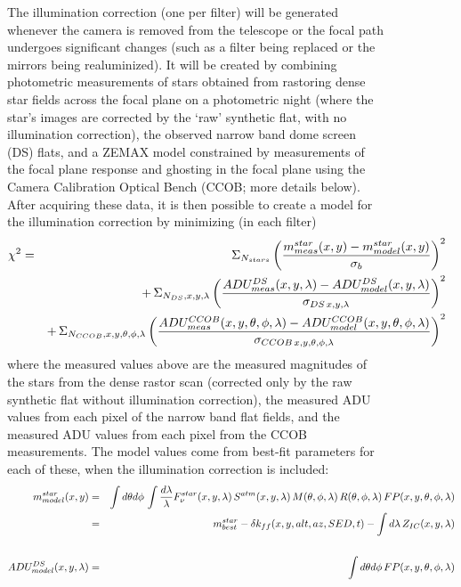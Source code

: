 \documentclass[12pt,preprint]{aastex}
\begin{document}
\begin{figure}[htbp]
{The illumination correction (one per filter) will be generated
whenever the camera is removed from the telescope or the focal path
undergoes significant changes (such as a filter being replaced or the
mirrors being realuminized). It will be created by combining
photometric measurements of stars obtained from rastoring dense star
fields across the focal plane on a photometric night (where the star's
images are corrected by the `raw' synthetic flat, with no illumination
correction), the observed narrow band dome screen (DS) flats, and a
ZEMAX model constrained by measurements of the focal plane response
and ghosting in the focal plane using the Camera Calibration Optical
Bench (CCOB; more details below). After acquiring these data, it is then possible to
create a model for the illumination correction by minimizing (in each
filter)
\begin{eqnarray}
 \chi^2 & = & \Sigma_{N_{stars}} \left( { m^{star}_{meas}(x,y) - m^{star}_{model}(x,y)
\over \sigma_b} \right)^2  \\
  & & +\, \Sigma_{N_{DS}, x,y,\lambda} \left( {
    ADU^{DS}_{meas}(x,y,\lambda) - ADU^{DS}_{ model}(x,y,\lambda) \over
    \sigma_{DS \, x,y,\lambda } } \right)^2  \nonumber  \\
 & & +\,  \Sigma_{N_{CCOB},x,y,\theta,\phi,\lambda} \left( { 
   ADU^{CCOB}_{meas}(x,y,\theta,\phi,\lambda) - ADU^{CCOB}_{model}(x,y,\theta,\phi,\lambda) \over
   \sigma_{CCOB \,x,y,\theta,\phi,\lambda}}  \right)^2   \nonumber
\end{eqnarray}
where the measured values above are the measured magnitudes of the stars
from the dense rastor scan (corrected only by the raw synthetic flat
without illumination correction), the measured ADU values from each pixel of the narrow band
flat fields, and the measured ADU values from each pixel from the CCOB
measurements. The model values come from best-fit parameters for each
of these, when the illumination correction is included: 
\begin{eqnarray}
m^{star}_{model}(x,y) & = &  \int d\theta d\phi \, \int {d\lambda \over \lambda}
F_\nu^{star}(x,y,\lambda)\,S^{atm}(x,y,\lambda)\,M(\theta,\phi,\lambda)\,R(\theta,\phi,\lambda)\,FP(x,y,\theta,\phi,\lambda)
\nonumber \\
 & = & m^{star}_{best} - \delta k_{ff}(x,y,alt,az,SED,t) - \int d\lambda \, Z_{IC}(x,y,\lambda)\\
\nonumber \\
ADU^{DS}_{model}(x,y,\lambda) & = & \int d\theta d\phi \,
FP(x,y,\theta,\phi,\lambda)   \nonumber \\

\end{eqnarray}}
\end{figure}
\end{document}
